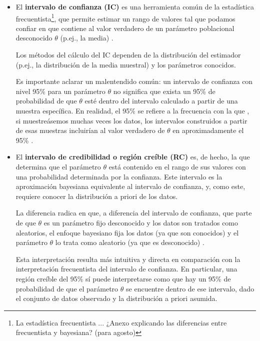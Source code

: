 \begin{itemize}

    \item El \textbf{intervalo de confianza (IC)} es una herramienta común de la estadística 
    frecuentista\footnote{
        La estadística frecuentista ... ¿Anexo explicando las diferencias entre frecuentista y bayesiana?
        (para agosto)
    },
    que permite estimar un rango de valores tal que podamos confiar en que contiene al valor verdadero de 
    un parámetro poblacional desconocido $\theta$ (p.ej., la media) \cite{berrendero2025}.

    Los métodos del cálculo del IC dependen de la distribución del estimador (p.ej., la distribución de la
    media muestral) y los parámetros conocidos. 

    Es importante aclarar un malentendido común: un intervalo de confianza con nivel 95\% para un parámetro 
    $\theta$ no significa que exista un 95\% de probabilidad de que $\theta$ esté dentro del intervalo 
    calculado a partir de una muestra específica. En realidad, el 95\% se refiere a la frecuencia con la que 
    , si muestreásemos muchas veces los datos, los intervalos construidos a partir de esas muestras incluirían 
    al valor verdadero de $\theta$ en aproximadamente el 95\% \cite{murphy2022}.


    \item El \textbf{intervalo de credibilidad o región creíble (RC)} es, de hecho, la que determina que el 
    parámetro $\theta$ está contenido en el rango de sus valores con una probabilidad determinada por la 
    confianza. Este intervalo es la aproximación bayesiana equivalente al intervalo de confianza, y, como 
    este, requiere conocer la distribución a priori de los datos.

    La diferencia radica en que, a diferencia del intervalo de confianza, que parte de que $\theta$ es un 
    parámetro fijo desconocido y los datos son tratados como aleatorios, el enfoque bayesiano fija los datos
    (ya que son conocidos) y el parámetro $\theta$ lo trata como aleatorio (ya que es desconocido) 
    \cite{murphy2022}.

    Esta interpretación resulta más intuitiva y directa en comparación con la interpretación frecuentista del 
    intervalo de confianza. En particular, una región creíble del 95\% sí puede interpretarse como que hay un
    95\% de probabilidad de que el parámetro $\theta$ se encuentre dentro de ese intervalo, dado el conjunto
    de datos observado y la distribución a priori asumida.



\end{itemize}

